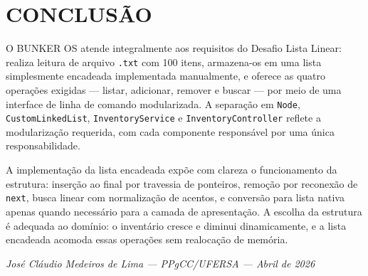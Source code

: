 \documentclass[12pt,a4paper]{article}
\begin{document}
\section{CONCLUSÃO}

O BUNKER OS atende integralmente aos requisitos do Desafio Lista Linear: realiza leitura de arquivo \texttt{.txt} com 100 itens, armazena-os em uma lista simplesmente encadeada implementada manualmente, e oferece as quatro operações exigidas — listar, adicionar, remover e buscar — por meio de uma interface de linha de comando modularizada. A separação em \texttt{Node}, \texttt{CustomLinkedList}, \texttt{InventoryService} e \texttt{InventoryController} reflete a modularização requerida, com cada componente responsável por uma única responsabilidade.

A implementação da lista encadeada expõe com clareza o funcionamento da estrutura: inserção ao final por travessia de ponteiros, remoção por reconexão de \texttt{next}, busca linear com normalização de acentos, e conversão para lista nativa apenas quando necessário para a camada de apresentação. A escolha da estrutura é adequada ao domínio: o inventário cresce e diminui dinamicamente, e a lista encadeada acomoda essas operações sem realocação de memória.

\vspace{1cm}
\begin{flushright}
\textit{José Cláudio Medeiros de Lima — PPgCC/UFERSA — Abril de 2026}
\end{flushright}
\end{document}
